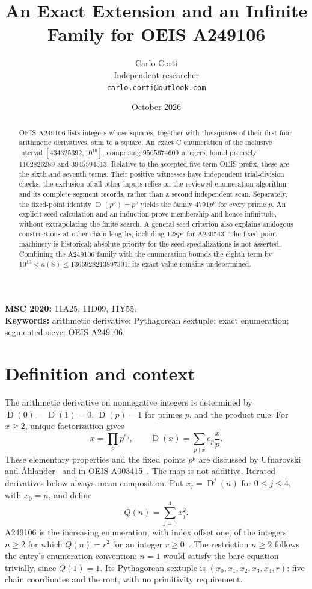 \documentclass[11pt,a4paper]{article}
\title{An Exact Extension and an Infinite Family for OEIS A249106}
\author{Carlo Corti\\Independent researcher\\\texttt{carlo.corti@outlook.com}}
\date{October 2026}
\theoremstyle{remark}
\newcommand{\D}{\operatorname{D}}
\begin{document}
\maketitle
\begin{abstract}
OEIS A249106 lists integers whose squares, together with the squares of their
first four arithmetic derivatives, sum to a square. An exact C enumeration of
the inclusive interval $[434325392,10^{10}]$, comprising $9565674609$ integers,
found precisely $1102826289$ and $3945594513$. Relative to the accepted
five-term OEIS prefix, these are the sixth and seventh terms. Their positive
witnesses have independent trial-division checks; the exclusion of all other
inputs relies on the reviewed enumeration algorithm and its complete segment
records, rather than a second independent scan. Separately, the fixed-point
identity $\D(p^p)=p^p$ yields the family $4791p^p$ for every prime $p$.
An explicit seed calculation and an induction prove membership and hence
infinitude, without extrapolating the finite search. A general seed
criterion also explains analogous constructions at other chain lengths,
including $128p^p$ for A230543. The fixed-point machinery is historical;
absolute priority for the seed specializations is not asserted.
Combining the A249106 family
with the enumeration bounds the eighth term by
$10^{10}<a(8)\le1366928213897301$; its exact value remains undetermined.
\end{abstract}
\noindent\textbf{MSC 2020:} 11A25, 11D09, 11Y55.\\
\textbf{Keywords:} arithmetic derivative; Pythagorean sextuple; exact enumeration;
segmented sieve; OEIS A249106.

\section{Definition and context}
The arithmetic derivative on nonnegative integers is determined by
$\D(0)=\D(1)=0$, $\D(p)=1$ for primes $p$, and the product rule.
For $x\ge2$, unique factorization gives
\begin{equation}\label{eq:derivative}
 x=\prod_p p^{e_p},\qquad \D(x)=\sum_{p\mid x}e_p\frac{x}{p}.
\end{equation}
These elementary properties and the fixed points $p^p$ are discussed by
Ufnarovski and \AA hlander~\cite[Theorem 6]{ufnarovski} and in OEIS A003415~\cite{derivative}.
The map is not additive. Iterated derivatives below always mean composition.
Put $x_j=\D^j(n)$ for $0\le j\le4$, with $x_0=n$, and define
\begin{equation}\label{eq:predicate}
 Q(n)=\sum_{j=0}^4 x_j^2.
\end{equation}
A249106 is the increasing enumeration, with index offset one, of the integers
$n\ge2$ for which $Q(n)=r^2$ for an integer $r\ge0$~\cite{sequence}.
The restriction $n\ge2$ follows the entry's enumeration convention:
$n=1$ would satisfy the bare equation trivially, since $Q(1)=1$.
Its Pythagorean sextuple is $(x_0,x_1,x_2,x_3,x_4,r)$: five chain coordinates
and the root, with no primitivity requirement.
\end{document}
